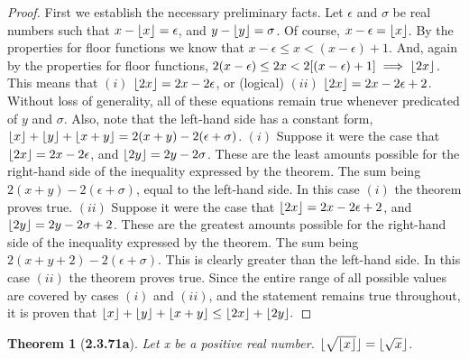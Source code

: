\documentclass[a4paper, 12pt]{article}
\theoremstyle{plain}
\newtheorem*{theorem*}{Theorem}
\DeclarePairedDelimiter{\floor}{\lfloor}{\rfloor}
\begin{document}
\begin{proof}
    First we establish the necessary preliminary facts. Let $\epsilon$ and $\sigma$ be real 
    numbers such that $x - \floor{x} = \epsilon$, and $y - \floor{y} = \sigma$. Of course, 
    $x - \epsilon = \floor{x}$. By the properties for floor functions we know that 
    $x-\epsilon \le x < (x - \epsilon) + 1$. And, again by the properties for floor functions,
    $2(x-\epsilon) \le 2x < 2[(x - \epsilon) + 1] \implies \floor{2x}$. This means that $(i)$ 
    $\floor{2x} = 2x-2\epsilon$, or (logical) $(ii)$ $\floor{2x} = 2x - 2\epsilon + 2$. 
    Without loss of generality, all of these equations remain true whenever predicated of $y$ 
    and $\sigma$. Also, note that the left-hand side has a constant form, 
    $\floor{x} + \floor{y} + \floor{x + y} = 2(x + y) - 2(\epsilon + \sigma)$.
    \newline
    \newline
    \indent $(i)$ Suppose it were the case that $\floor{2x} = 2x-2\epsilon$, and 
    $\floor{2y} = 2y-2\sigma$. \indent These are the least amounts possible for the right-hand 
    side of the \newline \indent inequality expressed by the theorem. The sum being 
    $2(x + y) - 2(\epsilon + \sigma)$, \indent equal to the left-hand side. In this case 
    $(i)$ the theorem proves true.
    \newline
    \newline
    \indent $(ii)$ Suppose it were the case that $\floor{2x} = 2x - 2\epsilon + 2$, and 
    \newline \indent $\floor{2y} = 2y - 2\sigma + 2$. These are the greatest amounts possible 
    for the \indent right-hand side of the inequality expressed by the theorem. The sum 
    \newline \indent being $2(x + y + 2) - 2(\epsilon + \sigma)$. This is clearly greater than 
    the left-hand \indent side. In this case $(ii)$ the theorem proves true.
    \newline
    \newline
    Since the entire range of all possible values are covered by cases $(i)$ and $(ii)$, and 
    the statement remains true throughout, it is proven that \newline 
    $\floor{x} + \floor{y} + \floor{x + y} \le \floor{2x} + \floor{2y}.$
\end{proof}

\pagebreak


\begin{theorem*}[\textbf{2.3.71a}]
    Let x be a positive real number. $\floor{\sqrt{\floor{x}}} = \floor{\sqrt{x}}$.
\end{theorem*}
\end{document}
